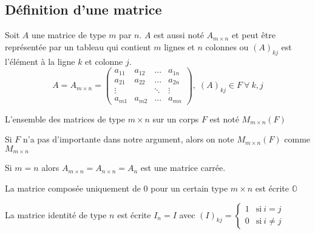 
\subsection{Définition d'une matrice}
\begin{definition}
    Soit $A$ une matrice de type $m$ par $n$. $A$ est aussi noté $A_{m \times n}$ et peut être représentée
    par un tableau qui contient $m$ lignes et $n$ colonnes ou $\left(A\right)_{kj}$ est l'élément
    à la ligne $k$ et colonne $j$. \[
        A = A_{m \times n} = \begin{pmatrix}
            a_{11} & a_{12} & \dots  & a_{1n} \\
            a_{21} & a_{22} & \dots  & a_{2n} \\
            \vdots &        & \ddots & \vdots \\
            a_{m1} & a_{m2} & \dots  & a_{mn}
        \end{pmatrix}, \; \left(A\right)_{kj} \in F \ \forall \ k, j
    \]
\end{definition}
\begin{definition}
    L'ensemble des matrices de type $m \times n$ sur un corps $F$ est noté $M_{m \times n}(F)$
\end{definition}
\begin{note}
    Si $F$ n'a pas d'importante dans notre argument, alors on note $M_{m \times n}(F)$ comme $M_{m \times n}$
\end{note}
\begin{definition}
    Si $m = n$ alors $A_{m \times n} = A_{n \times n} = A_n$ est une matrice carrée.
\end{definition}
\begin{definition}
    La matrice composée uniquement de 0 pour un certain type $m \times n$ est écrite $\mathbb{O}$
\end{definition}
\begin{definition}
    La matrice identité de type $n$ est écrite $I_n = I$ avec $(I)_{kj} = \begin{cases}
            1 & \text{si} \ i = j    \\
            0 & \text{si} \ i \neq j
        \end{cases}$
\end{definition}
